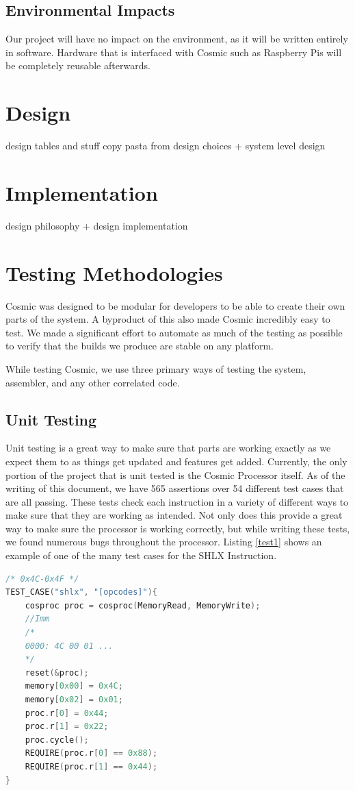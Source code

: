 \documentclass[conference]{IEEEtran}
\begin{document}
\subsection{Environmental Impacts}
Our project will have no impact on the environment, as it will be written entirely in software. Hardware that is interfaced with Cosmic such as Raspberry Pis will be completely reusable afterwards.


\section{Design}
design tables and stuff copy pasta from design choices + system level design


\section{Implementation}
design philosophy + design implementation


\section{Testing Methodologies}
Cosmic was designed to be modular for developers to be able to create their own parts of the system. A byproduct of this also made Cosmic incredibly easy to test. We made a significant effort to automate as much of the testing as possible to verify that the builds we produce are stable on any platform.

While testing Cosmic, we use three primary ways of testing the system, assembler, and any other correlated code.

\subsection{Unit Testing}
Unit testing is a great way to make sure that parts are working exactly as we expect them to as things get updated and features get added. Currently, the only portion of the project that is unit tested is the Cosmic Processor itself. As of the writing of this document, we have 565 assertions over 54 different test cases that are all passing. These tests check each instruction in a variety of different ways to make sure that they are working as intended. Not only does this provide a great way to make sure the processor is working correctly, but while writing these tests, we found numerous bugs throughout the processor. Listing \ref{test1} shows an example of one of the many test cases for the SHLX Instruction. 
\begin{lstlisting}[language={C++}, caption={A unit test for the SHLX instruction.}, label = {test1}]
/* 0x4C-0x4F */
TEST_CASE("shlx", "[opcodes]"){
    cosproc proc = cosproc(MemoryRead, MemoryWrite);
    //Imm
    /*
    0000: 4C 00 01 ...
    */
    reset(&proc);
    memory[0x00] = 0x4C;
    memory[0x02] = 0x01;
    proc.r[0] = 0x44;
    proc.r[1] = 0x22;
    proc.cycle();
    REQUIRE(proc.r[0] == 0x88);
    REQUIRE(proc.r[1] == 0x44);
}
\end{lstlisting}
\end{document}
